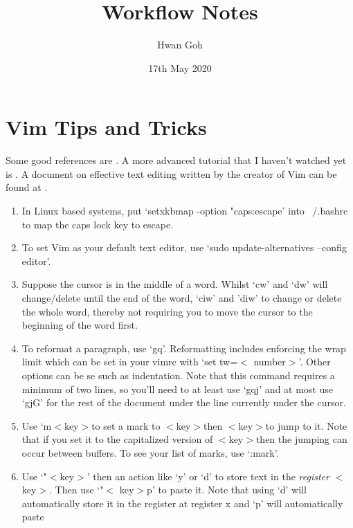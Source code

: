 \documentclass[10pt]{article}
\title{Workflow Notes}
\author{Hwan Goh}
\date{17th May 2020}
\newcommand{\tlangle}{$<$}
\newcommand{\trangle}{$>$}
\begin{document}
\maketitle

\section{Vim Tips and Tricks}
Some good references are \cite{chang2018vim,toomey2015mastering}. A more
advanced tutorial that I haven't watched yet is \cite{chang2020vim}. A document
on effective text editing written by the creator of Vim can be found at
\cite{moolenaar2000seven}.
\begin{enumerate}
    \item In Linux based systems, put `setxkbmap -option "caps:escape' into
        ~/.bashrc to map the caps lock key to escape.
    \item To set Vim as your default text editor, use `sudo update-alternatives
        --config editor'.  \item Suppose the cursor is in the middle of a word.
        Whilst `cw' and `dw' will change/delete until the end of the word, `ciw'
        and 'diw' to change or delete the whole word, thereby not requiring you
        to move the cursor to the beginning of the word first.
    \item To reformat a paragraph, use `gq'. Reformatting includes enforcing the
        wrap limit which can be set in your vimrc with `set tw=\tlangle
        number\trangle'. Other options can be se such as indentation. Note that
        this command requires a minimum of two lines, so you'll need to at least
        use `gqj' and at most use `gjG' for the rest of the document under the
        line currently under the cursor.
    \item Use `m\tlangle key\trangle to set a mark to \tlangle key\trangle then
        \tlangle key\trangle to jump to it.  Note that if you set it to the
        capitalized version of \tlangle key\trangle then the jumping can occur
        between buffers. To see your list of marks, use `:mark'.
    \item Use `"\tlangle key\trangle' then an action like `y' or `d' to store
        text in the \textit{register} \tlangle key\trangle. Then use `"\tlangle
        key\trangle p' to paste it. Note that using `d' will automatically store
        it in the register at register x and `p' will automatically paste

\end{enumerate}
\end{document}
